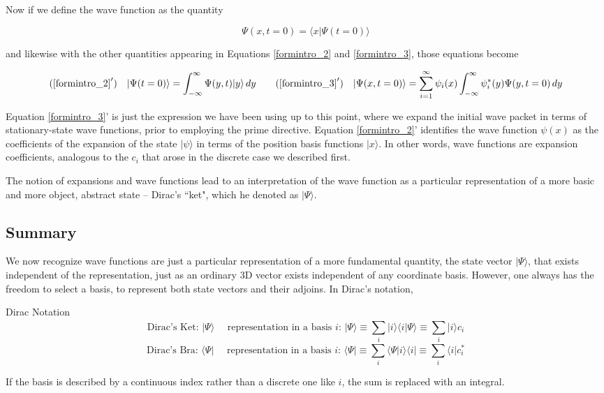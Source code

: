Now if we define the wave function as the quantity 

\[
\Psi(x, t= 0) = \langle x | \Psi(t = 0)\rangle
\] \vspace{3px}

and likewise with the other quantities appearing in Equations \ref{formintro_2}
and \ref{formintro_3}, those equations become 

\[
  (\ref{formintro_2}') \quad |\Psi(t = 0)\rangle = \int_{-\infty}^{\infty}
  \Psi(y, t) | y \rangle\, dy \qquad (\ref{formintro_3}') \quad |\Psi(x,
  t=0)\rangle = \sum_{i=1}^{\infty} \psi_i(x) \int_{-\infty}^{\infty}
  \psi_i^*(y) \Psi(y, t=0) \, dy  
\] \vspace{3px}

Equation \ref{formintro_3}' is just the expression we have been using up to
this point, where we expand the initial wave packet in terms of
stationary-state wave functions, prior to employing the prime directive.
Equation \ref{formintro_2}' identifies the wave function $\psi(x)$ as the
coefficients of the expansion of the state $| \psi \rangle$ in terms of the
position basis functions $|x\rangle$. In other words, wave functions are
expansion coefficients, analogous to the $c_i$ that arose in the discrete case
we described first. 

The notion of expansions and wave functions lead to an interpretation of the
wave function as a particular representation of a more basic and more object,
abstract state -- Dirac's ``ket", which he denoted as $|\Psi\rangle$. 

\subsection{Summary}

We now recognize wave functions are just a particular representation of a more
fundamental quantity, the state vector $|\Psi\rangle$, that exists independent
of the representation, just as an ordinary 3D vector exists independent of any
coordinate basis. However, one always has the freedom to select a basis, to
represent both state vectors and their adjoins. In Dirac's notation, 

\begin{mainbox}{Dirac Notation}
  \[
  \text{Dirac's Ket: } |\Psi\rangle  \quad \text{ representation in a basis
  $i$: } |\Psi\rangle \equiv \sum_{i}^{} | i \rangle \langle i | \Psi \rangle
  \equiv \sum_{i}^{} |i\rangle c_i
  \] \[ \text{Dirac's Bra: } \langle \Psi | \quad \text{ representation in
  a basis $i$: } \langle \Psi | \equiv \sum_{i}^{} \langle\Psi | i\rangle
  \langle i | \equiv \sum_{i}^{} \langle i | c_i^*  \] \vspace{3px}

  If the basis is described by a continuous index rather than a discrete one
  like  $i$, the sum is replaced with an integral.
\end{mainbox}



